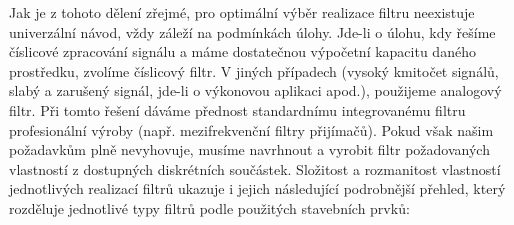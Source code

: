       Jak je z tohoto dělení zřejmé, pro optimální výběr realizace filtru neexistuje univerzální
      návod, vždy záleží na podmínkách úlohy. Jde-li o úlohu, kdy řešíme číslicové zpracování
      signálu a máme dostatečnou výpočetní kapacitu daného prostředku, zvolíme číslicový filtr. V
      jiných případech (vysoký kmitočet signálů, slabý a zarušený signál, jde-li o výkonovou
      aplikaci apod.), použijeme analogový filtr. Při tomto řešení dáváme přednost standardnímu
      integrovanému filtru profesionální výroby (např. mezifrekvenční filtry přijímačů). Pokud
      však našim požadavkům plně nevyhovuje, musíme navrhnout a vyrobit filtr požadovaných
      vlastností z dostupných diskrétních součástek. Složitost a rozmanitost vlastností
      jednotlivých realizací filtrů ukazuje i jejich následující podrobnější přehled, který
      rozděluje jednotlivé typy filtrů podle použitých stavebních prvků:

